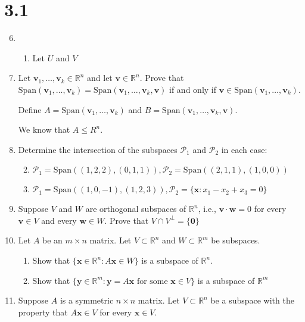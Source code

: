 \documentclass[letterpaper]{article}
\begin{document}
\section*{3.1}
\begin{enumerate}
\setcounter{enumi}{5}
\item
  \begin{enumerate}
  \item
  Let $U$ and $V$
  \end{enumerate}
\setcounter{enumi}{7}
\item
Let $\mathbf{v}_1,\dots,\mathbf{v}_k\in \mathbb{R}^n$ and let $\mathbf{v}\in \mathbb{R}^n$. Prove that $\text{Span}(\mathbf{v}_1,\dots,\mathbf{v}_k)=\text{Span}(\mathbf{v}_1,\dots,\mathbf{v}_k,\mathbf{v})$ if and only if $\mathbf{v}\in \text{Span}(\mathbf{v}_1,\dots,\mathbf{v}_k)$.

Define $A=\text{Span}(\mathbf{v}_1,\dots,\mathbf{v}_k)$ and $B=\text{Span}(\mathbf{v}_1,\dots,\mathbf{v}_k,\mathbf{v})$.

We know that $A\le R^{n}$. 
\item
Determine the intersection of the subspaces $\mathcal{P}_1$ and $\mathcal{P}_2$ in each case:
  \begin{enumerate}
  \setcounter{enumii}{1}
  \item
    $\mathcal{P}_1=\text{Span}\left((1,2,2),(0,1,1)\right),\mathcal{P}_2=\text{Span}\left((2,1,1),(1,0,0)\right)$
  \item
    $\mathcal{P}_1=\text{Span}\left((1,0,-1),(1,2,3)\right),\mathcal{P}_2=\{\mathbf{x}:x_1-x_2+x_3=0\}$
  \end{enumerate}
\setcounter{enumi}{10}
\item
Suppose $V$ and $W$ are orthogonal subspaces of $\mathbb{R}^n$, i.e., $\mathbf{v}\cdot\mathbf{w}=0$ for every $\mathbf{v}\in V$ and every $\mathbf{w}\in W$. Prove that $V\cap V^{\perp}=\{\mathbf{0}\}$
\setcounter{enumi}{14}
\item
Let $A$ be an $m\times n$ matrix. Let $V\subset \mathbb{R}^n$ and $W\subset \mathbb{R}^m$ be subspaces.
  \begin{enumerate}
  \item
  Show that $\{\mathbf{x}\in \mathbb{R}^n:A\mathbf{x}\in W\}$ is a subspace of $\mathbb{R}^n$.
  \item
  Show that $\{\mathbf{y}\in \mathbb{R}^m:\mathbf{y}=A\mathbf{x}\text{ for some }\mathbf{x}\in V\}$ is a subspace of $\mathbb{R}^m$
  \end{enumerate}
\item
Suppose $A$ is a symmetric $n\times n$ matrix. Let $V\subset \mathbb{R}^n$ be a  subspace with the property that $A\mathbf{x}\in V$ for every $\mathbf{x}\in V$. 
\end{enumerate}
\end{document}
